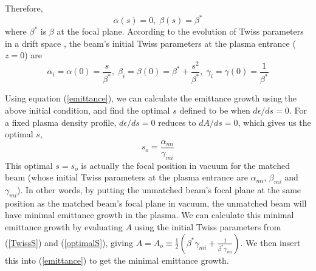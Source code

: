 \documentclass[%
reprint, superscriptaddress,
 amsmath,amssymb, aps,
prstab,
]{revtex4-2}
\begin{document}
%
Therefore, \[ \alpha(s) = 0,\; \beta(s) =
\beta^* \] where $\beta^*$ is $\beta$ at the focal plane.
According to the evolution of Twiss parameters in a drift space \cite{Lee}, the beam's initial Twiss parameters at the plasma entrance ($z=0$)
are \begin{equation} \alpha_i = \alpha(0) = \frac{s}{\beta^*},\;
\beta_i = \beta(0) = \beta^* + \frac{s^2}{\beta^*},\; \gamma_i =
\gamma(0) = \frac{1}{\beta^*} \label{TwissS} \end{equation}

Using equation (\ref{emittance}), we can calculate the emittance
growth using the above initial condition, and find the
optimal $s$ defined to be when $d\epsilon/ds = 0$. For a fixed plasma density
profile, $d\epsilon/ds = 0$ reduces to $dA/ds = 0$, which gives
us the optimal $s$, \begin{equation} s_o =
\frac{\alpha_{mi}}{\gamma_{mi}} \label{optimalS} \end{equation} 
This optimal $s = s_o$ is actually the focal
position in vacuum for the matched beam (whose initial Twiss parameters at the plasma entrance
are $\alpha_{mi}$, $\beta_{mi}$ and $\gamma_{mi}$). In other words, by
putting the unmatched beam's focal plane at the same position as the
matched beam's focal plane in vacuum, the unmatched beam will have
minimal emittance growth in the plasma. We can calculate this minimal emittance growth by 
evaluating $A$ using the initial Twiss parameters from (\ref{TwissS}) and (\ref{optimalS}), giving
$A = A_o \equiv \frac{1}{2}(\beta^* \gamma_{mi} +\frac{1}{\beta^* \gamma_{mi}}) $. We then insert this into (\ref{emittance})
to get the minimal emittance growth.
\end{document}
